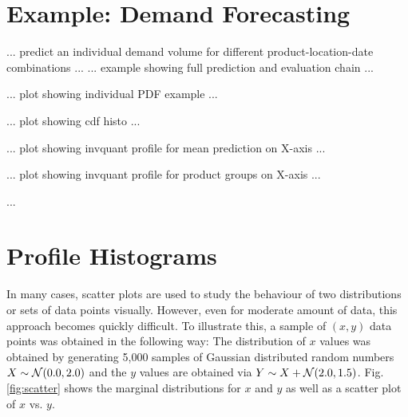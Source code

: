 \documentclass[BCOR=1mm, DIV=calc,10pt,
twoside=true,
twocolumn,
headings=normal]{scrartcl}
\newcommand{\fig}{Fig. }
\begin{document}
\section{Example: Demand Forecasting}
\label{sec:example}

... predict an individual demand volume for different product-location-date combinations ...
... example showing full prediction and evaluation chain ...

... plot showing individual PDF example ...


... plot showing cdf histo ...


... plot showing invquant profile for mean prediction on X-axis ...


... plot showing invquant profile for product groups on X-axis ...




...





\appendix

\section{Profile Histograms}
In many cases, scatter plots are used to study the behaviour of two distributions or sets of data points visually. 
However, even for moderate amount of data, this approach becomes quickly difficult.
To illustrate this, a sample of $(x,y)$ data points was obtained in the following way:
The distribution of $x$ values was obtained by generating 5,000 samples of Gaussian
distributed random numbers $X \sim {\cal N}(0.0,2.0)$ and the $y$ values are obtained via $Y \sim X +  {\cal N}(2.0,1.5)$.
\fig \ref{fig:scatter} shows the marginal distributions for $x$ and $y$ as well as a scatter plot of $x$ vs. $y$.
\end{document}
